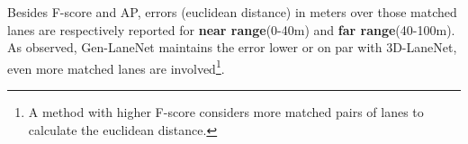\documentclass[10pt,twocolumn,letterpaper]{article}
\begin{document}
Besides F-score and AP, errors (euclidean distance) in meters over those matched lanes are respectively reported for {\bf near range}(0-40m) and {\bf far range}(40-100m). As observed, Gen-LaneNet maintains the error lower or on par with 3D-LaneNet, even more matched lanes are involved\footnote{A method with higher F-score considers more matched pairs of lanes to calculate the euclidean distance.}.






\begin{comment}

\begin{table}[h!]
    {\small
    \centering
    \begin{tabular}{|c|c|c|c|}
        \hline
        \backslashbox{Method}{Metric}           & F-score & AP-1 & AP-2 \\
        \hline
        3D-LaneNet                              & 0.864 & 0.893 & 0.823 \\
        \hline
        {\color{blue}3D-LaneNet (extend)}       & 0.900 & 0.920 & 0.855 \\
        \hline
        3D-GeoNet                               & 0.885 & 0.913 & 0.856 \\
        \hline
        {\color{blue}3D-GeoNet (extend)}        & 0.918 & 0.938 & 0.893 \\
        \hline
        Gen-LaneNet                             & 0.851 & 0.876 & 0.793 \\
        \hline
        {\color{blue}Gen-LaneNet (extend)}      & 0.881 & 0.901 & 0.812 \\
        \hline
    \end{tabular}
    \caption{Standard comparison of 3D lane detection methods.}
    \label{tab:overall:compare:standard}
    }
\end{table}

\begin{table}[h!]
    {\small
    \centering
    \begin{tabular}{|c|c|c|c|}
        \hline
        \backslashbox{Method}{Metric}           & F-score & AP-1 & AP-2 \\
        \hline
        3D-LaneNet                              & 0.720 & 0.746 & 0.586 \\
        \hline
        {\color{blue}3D-LaneNet (extend)}       & 0.809 & 0.820 & 0.652 \\
        \hline
        3D-GeoNet                               & 0.754 & 0.790 & 0.652 \\
        \hline
        {\color{blue}3D-GeoNet (extend)}        & 0.847 & 0.866 & 0.740 \\
        \hline
        Gen-LaneNet                             & 0.700 & 0.730 & 0.542 \\
        \hline
        {\color{blue}Gen-LaneNet (extend)}      & 0.780 & 0.790 & 0.586 \\
        \hline
    \end{tabular}
    \caption{Comparison of methods in handling rare scenes.}
    \label{tab:overall:compare:rare}
    }
\end{table}


\end{comment}
\end{document}
